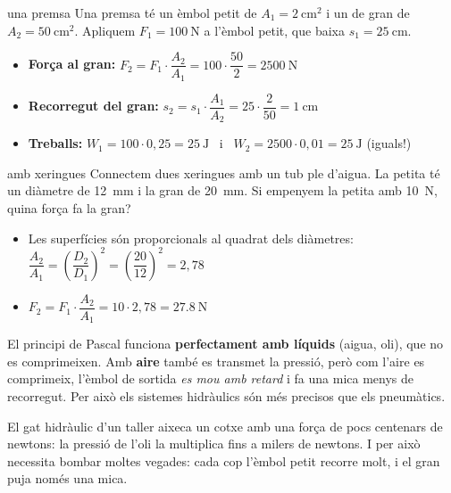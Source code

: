 \begin{exemple}{una premsa}
Una premsa té un èmbol petit de $A_1 = \SI{2}{\centi\meter\squared}$ i un de gran de $A_2 = \SI{50}{\centi\meter\squared}$. Apliquem $F_1 = \SI{100}{\newton}$ a l'èmbol petit, que baixa $s_1 = \SI{25}{\centi\meter}$.
\begin{itemize}
 \item \textbf{Força al gran:} $F_2 = F_1 \cdot \dfrac{A_2}{A_1} = 100 \cdot \dfrac{50}{2} = \SI{2500}{\newton}$
 \item \textbf{Recorregut del gran:} $s_2 = s_1 \cdot \dfrac{A_1}{A_2} = 25 \cdot \dfrac{2}{50} = \SI{1}{\centi\meter}$
 \item \textbf{Treballs:} $W_1 = 100 \cdot 0{,}25 = \SI{25}{\joule}$ \ i \ $W_2 = 2500 \cdot 0{,}01 = \SI{25}{\joule}$ (iguals!)
\end{itemize}
\end{exemple}

\begin{exemple}{amb xeringues}
Connectem dues xeringues amb un tub ple d'aigua. La petita té un diàmetre de \SI{12}{\milli\meter} i la gran de \SI{20}{\milli\meter}. Si empenyem la petita amb \SI{10}{\newton}, quina força fa la gran?
\begin{itemize}
 \item Les superfícies són proporcionals al quadrat dels diàmetres: $\dfrac{A_2}{A_1} = \left(\dfrac{D_2}{D_1}\right)^2 = \left(\dfrac{20}{12}\right)^2 = 2{,}78$
 \item $F_2 = F_1 \cdot \dfrac{A_2}{A_1} = 10 \cdot 2{,}78 = \SI{27,8}{\newton}$
\end{itemize}
\end{exemple}

\begin{atencio}
El principi de Pascal funciona \textbf{perfectament amb líquids} (aigua, oli), que no es comprimeixen. Amb \textbf{aire} també es transmet la pressió, però com l'aire es comprimeix, l'èmbol de sortida \emph{es mou amb retard} i fa una mica menys de recorregut. Per això els sistemes hidràulics són més precisos que els pneumàtics.
\end{atencio}

\begin{sabiesque}
El gat hidràulic d'un taller aixeca un cotxe amb una força de pocs centenars de newtons: la pressió de l'oli la multiplica fins a milers de newtons. I per això necessita bombar moltes vegades: cada cop l'èmbol petit recorre molt, i el gran puja només una mica.
\end{sabiesque}

